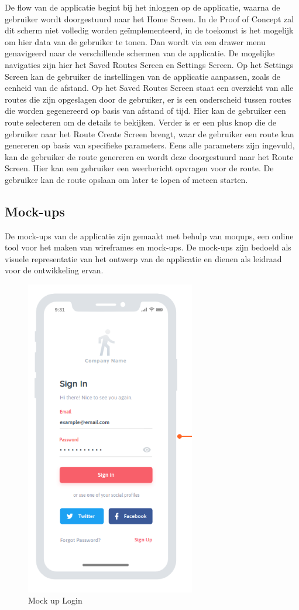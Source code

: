 De flow van de applicatie begint bij het inloggen op de applicatie, waarna de gebruiker wordt doorgestuurd naar het Home Screen. In de Proof of Concept zal dit scherm niet volledig worden geïmplementeerd, in de toekomst is het mogelijk om hier data van de gebruiker te tonen. Dan wordt via een drawer menu genavigeerd naar de verschillende schermen van de applicatie. De mogelijke navigaties zijn hier het Saved Routes Screen en Settings Screen. Op het Settings Screen kan de gebruiker de instellingen van de applicatie aanpassen, zoals de eenheid van de afstand. Op het Saved Routes Screen staat een overzicht van alle routes die zijn opgeslagen door de gebruiker, er is een onderscheid tussen routes die worden gegenereerd op basis van afstand of tijd. Hier kan de gebruiker een route selecteren om de details te bekijken. Verder is er een plus knop die de gebruiker naar het Route Create Screen brengt, waar de gebruiker een route kan genereren op basis van specifieke parameters. Eens alle parameters zijn ingevuld, kan de gebruiker de route genereren en wordt deze doorgestuurd naar het Route Screen. Hier kan een gebruiker een weerbericht opvragen voor de route. De gebruiker kan de route opslaan om later te lopen of meteen starten.

\subsection{Mock-ups}

De mock-ups van de applicatie zijn gemaakt met behulp van moqups, een online tool voor het maken van wireframes en mock-ups. De mock-ups zijn bedoeld als visuele representatie van het ontwerp van de applicatie en dienen als leidraad voor de ontwikkeling ervan.

    \begin{figure}[htbp]
        \includegraphics[width=20em]{./graphics/login_Mockup.png}
        \centering
        \caption{Mock up Login}
        \label{fig:loginMockup}
    \end{figure}

